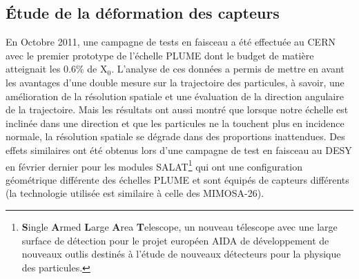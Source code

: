 \documentclass[a4papper, 10pt]{article}
\begin{document}
        \subsection{Étude de la déformation des capteurs}


       
        En Octobre 2011, une campagne de tests en faisceau a été effectuée au CERN avec le premier prototype de l'échelle PLUME dont le budget de matière atteignait les 0.6\% de X$_0$. L'analyse de ces données a permis de %
        mettre en avant les avantages d'une double mesure sur la trajectoire des particules, à savoir, une amélioration de la résolution spatiale et une évaluation de la direction angulaire de la trajectoire.
        Mais les résultats ont aussi montré que lorsque notre échelle est inclinée dans une direction et que les particules ne la touchent plus en incidence normale, la résolution spatiale se dégrade dans des proportions inattendues.
        Des effets similaires ont été obtenus lors d'une campagne de test en faisceau au DESY en février dernier pour les modules SALAT\footnote{\textbf{S}ingle \textbf{A}rmed \textbf{L}arge \textbf{A}rea \textbf{T}elescope, un nouveau télescope avec une large surface de détection pour le projet européen AIDA de développement de nouveaux outlis destinés à l'étude de nouveaux détecteurs pour la physique des particules.} qui ont une configuration géométrique différente des échelles PLUME et sont équipés de capteurs différents (la technologie utilisée est similaire à celle des MIMOSA-26). 
        
\end{document}
